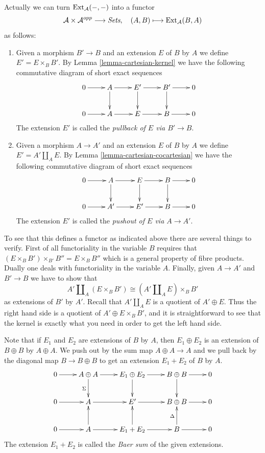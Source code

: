 \medskip\noindent
Actually we can turn $\mathop{\mathrm{Ext}}\nolimits_\mathcal{A}(-, -)$
into a
functor
$$
\mathcal{A} \times \mathcal{A}^{opp}
\longrightarrow \textit{Sets}, \quad
(A, B) \longmapsto \mathop{\mathrm{Ext}}\nolimits_\mathcal{A}(B, A)
$$
as follows:
\begin{enumerate}
\item Given a morphism $B' \to B$ and an
extension
$E$ of $B$ by $A$ we define $E' = E \times_B
B'$.
By Lemma \ref{lemma-cartesian-kernel} we have
the following
commutative diagram of short exact sequences
$$
\xymatrix{
0 \ar[r] & A \ar[r] \ar[d] & E' \ar[r] \ar[d]
& B' \ar[r] \ar[d] & 0 \\
0 \ar[r] & A \ar[r] & E \ar[r] & B \ar[r] & 0
}
$$
The extension $E'$ is called the {\it
pullback of $E$ via
$B' \to B$}.
\item Given a morphism $A \to A'$ and an
extension
$E$ of $B$ by $A$ we define $E' = A' \amalg_A
E$.
By Lemma \ref{lemma-cartesian-cocartesian}
we have the following commutative diagram
of short exact sequences
$$
\xymatrix{
0 \ar[r] & A \ar[r] \ar[d] & E \ar[r] \ar[d]
& B \ar[r] \ar[d] & 0 \\
0 \ar[r] & A' \ar[r] & E' \ar[r] & B \ar[r] &
0
}
$$
The extension $E'$ is called the {\it pushout
of $E$ via
$A \to A'$}.
\end{enumerate}
To see that this defines a functor as
indicated above
there are several things to verify. First of
all
functoriality in the variable $B$ requires
that
$(E \times_B B') \times_{B'} B'' = E \times_B
B''$
which is a general property of fibre
products.
Dually one deals with functoriality in the
variable $A$. Finally, given $A \to A'$ and
$B' \to B$ we have to show that
$$
A' \amalg_A (E \times_B B')
\cong
(A' \amalg_A E)\times_B B'
$$
as extensions of $B'$ by $A'$. Recall that
$A' \amalg_A E$
is a quotient of $A' \oplus E$.
Thus the right hand side is a quotient of
$A' \oplus E \times_B B'$, and it is
straightforward to see that
the kernel is exactly what you need in order
to
get the left hand side.

\medskip\noindent
Note that if $E_1$ and $E_2$ are extensions
of
$B$ by $A$, then $E_1\oplus E_2$ is an
extension
of $B \oplus B$ by $A\oplus A$. We
push out by the sum map $A \oplus A \to A$
and we
pull back by the diagonal map $B \to B \oplus
B$ to get
an extension $E_1 + E_2$ of $B$ by $A$.
$$
\xymatrix{
0 \ar[r] &
A \oplus A \ar[r] \ar[d]_\Sigma &
E_1 \oplus E_2 \ar[r] \ar[d] &
B \oplus B \ar[r] \ar[d] &
0 \\
0 \ar[r] &
A \ar[r] &
E' \ar[r] &
B \oplus B \ar[r] &
0\\
0 \ar[r] &
A \ar[r] \ar[u] &
E_1 + E_2 \ar[r] \ar[u] &
B \ar[r] \ar[u]^\Delta &
0
}
$$
The extension $E_1 + E_2$ is called the {\it
Baer sum} of the
given extensions.

